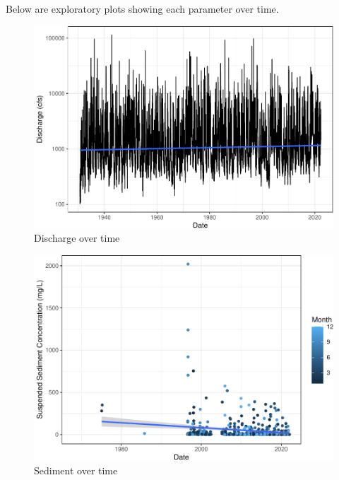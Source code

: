 \documentclass[
  12pt,
]{article}
\begin{document}
Below are exploratory plots showing each parameter over time.

\begin{figure}
\centering
\includegraphics{Project_Template_files/figure-latex/exploration_plot1-1.pdf}
\caption{Discharge over time}
\end{figure}

\begin{figure}
\centering
\includegraphics{Project_Template_files/figure-latex/exploration_plot2-1.pdf}
\caption{Sediment over time}
\end{figure}
\end{document}
